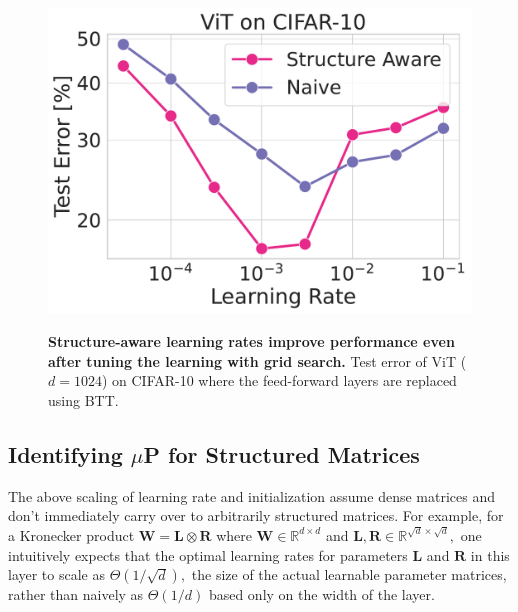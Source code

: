 \documentclass{article}
\newcommand{\mbf}[1]{{\boldsymbol{\mathbf{#1}}}}
\newcommand{\bm}{\mbf}
\theoremstyle{plain}
\theoremstyle{definition}
\theoremstyle{remark}
\newcommand{\mup}{$\mu$P\xspace}
\newcommand{\R}{\mathbb{R}}
\begin{document}
\begin{figure}[!b]
\centering
    \includegraphics[width=0.8\linewidth]{figs/naive_ffn.pdf}\\
   \caption{
   \textbf{Structure-aware learning rates improve performance even after tuning the learning with grid search.}
   Test error of ViT ($d=1024$) on CIFAR-10 where the feed-forward layers are replaced using BTT. 
   }
    \label{fig:ffn}
    \vspace{-4mm}
\end{figure}

\subsection{Identifying \mup for Structured Matrices} \label{sec:struct-aware}
The above scaling of learning rate and initialization assume dense matrices and don't immediately carry over to arbitrarily structured matrices. For example, for a Kronecker product $\bm{W} = \bm{L} \otimes \bm{R}$ where $\bm{W} \in \R^{d\times d}$ and $\bm{L}, \bm{R} \in \R^{\sqrt{d} \times \sqrt{d}},$ one intuitively expects that the optimal learning rates for parameters $\bm{L}$ and $\bm{R}$ in this layer to scale as $\Theta(1/\sqrt{d}),$ the size of the actual learnable parameter matrices, rather than naively as $\Theta(1/d)$ based only on the width of the layer.
\end{document}
